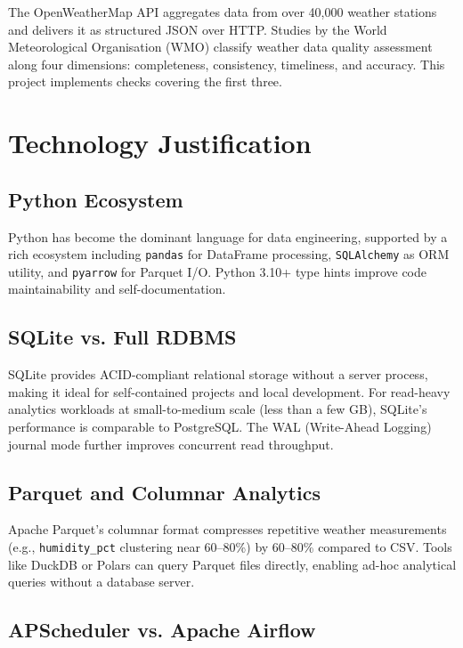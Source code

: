 \documentclass[12pt,a4paper]{report}
\begin{document}
The OpenWeatherMap API aggregates data from over 40,000 weather stations and delivers it as structured JSON over HTTP. Studies by the World Meteorological Organisation (WMO) classify weather data quality assessment along four dimensions: completeness, consistency, timeliness, and accuracy. This project implements checks covering the first three.

\section{Technology Justification}

\subsection{Python Ecosystem}

Python has become the dominant language for data engineering, supported by a rich ecosystem including \texttt{pandas} for DataFrame processing, \texttt{SQLAlchemy} as ORM utility, and \texttt{pyarrow} for Parquet I/O. Python 3.10+ type hints improve code maintainability and self-documentation.

\subsection{SQLite vs. Full RDBMS}

SQLite provides ACID-compliant relational storage without a server process, making it ideal for self-contained projects and local development. For read-heavy analytics workloads at small-to-medium scale (less than a few GB), SQLite's performance is comparable to PostgreSQL. The WAL (Write-Ahead Logging) journal mode further improves concurrent read throughput.

\subsection{Parquet and Columnar Analytics}

Apache Parquet's columnar format compresses repetitive weather measurements (e.g., \texttt{humidity\_pct} clustering near 60--80\%) by 60--80\% compared to CSV. Tools like DuckDB or Polars can query Parquet files directly, enabling ad-hoc analytical queries without a database server.

\subsection{APScheduler vs. Apache Airflow}
\end{document}

